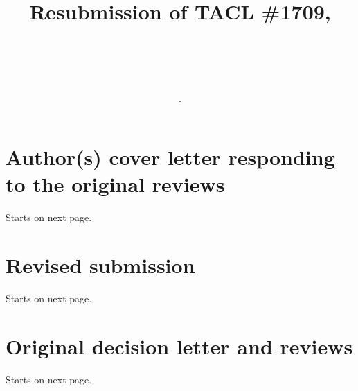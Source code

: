 \documentclass{article}[11pt,a4paper,oneside]
\title{Resubmission of TACL \#1709, \\ \subtitle.   \\}
\newcommand{\resubmission}{char-rnn-knowledge-main1.pdf}  %
\newcommand{\origdecision}{second-round-decision.pdf}  %
\newcommand{\coverfile}{second-round-notes.pdf}  %
\begin{document}
\maketitle

\tableofcontents

\section{Author(s) cover letter responding to the original reviews} Starts on next page.

\section{Revised submission} Starts on next page.

\section{Original decision letter and reviews} Starts on next page.

\end{document}
